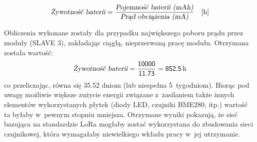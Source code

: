 \begin{equation}\label{eqn:battery-life}
    \textsl{Żywotność baterii} = \frac{\textsl{Pojemność baterii (mAh)}}{\textsl{Prąd obciążenia (mA)}}\quad\text{[h]}
\end{equation}

Obliczenia wykonane zostały dla przypadku największego poboru prądu przez moduły (SLAVE 3), zakładając ciągłą,
nieprzerwaną pracę modułu. Otrzymana została wartość:
\begin{equation*}
    \textsl{Żywotność baterii} = \mathsf{\frac{10000}{11.73}} = \mathsf{852.5}\,\text{h}
\end{equation*}
co przeliczając, równa się 35.52 dniom (lub niespełna 5~tygodniom). Biorąc pod uwagę możliwie większe zużycie energii
związane z~zasilaniem także innych elementów wykorzystanych płytek (diody LED, czujniki BME280, itp.) wartość ta byłaby
w~pewnym stopniu mniejsza. Otrzymane wyniki pokazują, że sieć bazująca na standardzie LoRa mogłaby zostać wykorzystana
do zbudowania sieci czujnikowej, która wymagałaby niewielkiego wkładu pracy w~jej utrzymanie.